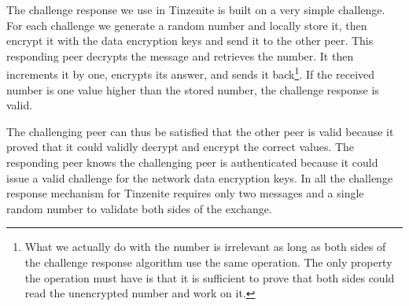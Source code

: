 The challenge response we use in Tinzenite is built on a very simple challenge.
For each challenge we generate a random number and locally store it, then encrypt it with the data encryption keys and send it to the other peer.
This responding peer decrypts the message and retrieves the number.
It then increments it by one, encrypts its answer, and sends it back\footnote{What we actually do with the number is irrelevant as long as both sides of the challenge response algorithm use the same operation. The only property the operation must have is that it is sufficient to prove that both sides could read the unencrypted number and work on it.}.
If the received number is one value higher than the stored number, the challenge response is valid.

The challenging peer can thus be satisfied that the other peer is valid because it proved that it could validly decrypt and encrypt the correct values.
The responding peer knows the challenging peer is authenticated because it could issue a valid challenge for the network data encryption keys.
In all the challenge response mechanism for Tinzenite requires only two messages and a single random number to validate both sides of the exchange.
